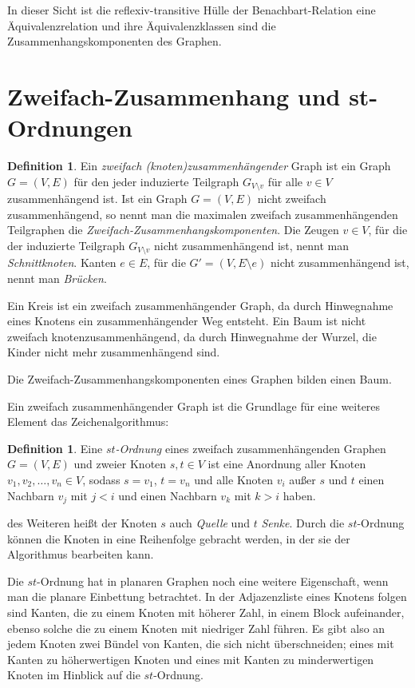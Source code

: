 \documentclass[a4paper]{scrreprt}
\theoremstyle{definition}
\newtheorem{definition}[satz]{Definition}
\begin{document}
In dieser Sicht ist die reflexiv-transitive Hülle der Benachbart-Relation eine Äquivalenzrelation und ihre Äquivalenzklassen sind die Zusammenhangskomponenten des Graphen. %


\section{Zweifach-Zusammenhang und st-Ordnungen}

\begin{definition}
  Ein \emph{zweifach (knoten)zusammenhängender} Graph ist ein Graph $G=(V, E)$ für den jeder induzierte Teilgraph $G_{V \setminus v}$ für alle $v \in V$ zusammenhängend ist.
  Ist ein Graph $G=(V, E)$  nicht zweifach zusammenhängend, so nennt man die maximalen zweifach zusammenhängenden Teilgraphen die \emph{Zweifach-Zusammenhangskomponenten}. Die Zeugen $v \in V$, für die der induzierte Teilgraph $G_{V \setminus v}$ nicht zusammenhängend ist, nennt man \emph{Schnittknoten}. Kanten $e \in E$, für die $G' = (V, E \setminus e)$ nicht zusammenhängend ist, nennt man \emph{Brücken}.
\end{definition}

Ein Kreis ist ein zweifach zusammenhängender Graph, da durch Hinwegnahme eines Knotens ein zusammenhängender Weg entsteht. Ein Baum ist nicht zweifach knotenzusammenhängend, da durch Hinwegnahme der Wurzel, die Kinder nicht mehr zusammenhängend sind.

Die Zweifach-Zusammenhangskomponenten eines Graphen bilden einen Baum.

Ein zweifach zusammenhängender Graph ist die Grundlage für eine weiteres Element das Zeichenalgorithmus:

\begin{definition}
  Eine \emph{$st$-Ordnung} eines zweifach zusammenhängenden Graphen $G = (V, E)$ und zweier Knoten $s, t \in V$ ist eine Anordnung aller Knoten $v_1, v_2, \dots, v_n \in V$, sodass $s = v_1$, $t = v_n$ und alle Knoten $v_i$ außer $s$ und $t$  einen Nachbarn $v_j$ mit $j < i$ und einen Nachbarn $v_k$ mit $k > i$ haben.
\end{definition}

des Weiteren heißt der Knoten $s$ auch \emph{Quelle} und $t$ \emph{Senke}. Durch die $st$-Ordnung können die Knoten in eine Reihenfolge gebracht werden, in der sie der Algorithmus bearbeiten kann.

Die $st$-Ordnung hat in planaren Graphen noch eine weitere Eigenschaft, wenn man die planare Einbettung betrachtet. In der Adjazenzliste eines Knotens folgen sind Kanten, die zu einem Knoten mit höherer Zahl, in einem Block aufeinander, ebenso solche die zu einem Knoten mit niedriger Zahl führen. Es gibt also an jedem Knoten zwei Bündel von Kanten, die sich nicht überschneiden; eines mit Kanten zu höherwertigen Knoten und eines mit Kanten zu minderwertigen Knoten im Hinblick auf die $st$-Ordnung.
\end{document}
